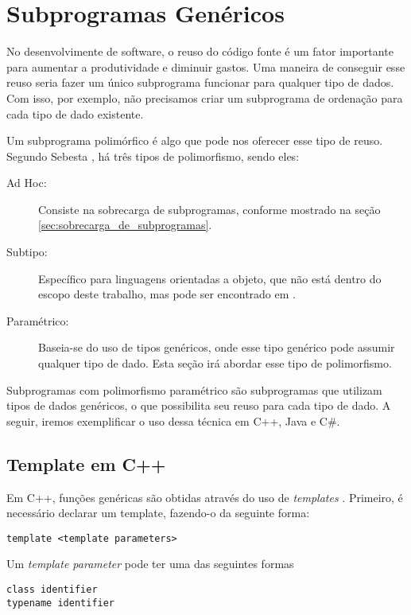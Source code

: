 \section{Subprogramas Genéricos} %
\label{sec:subprogramas_genericos}
No desenvolvimente de software, o reuso do código fonte é um fator importante para aumentar a produtividade e diminuir gastos. Uma maneira de conseguir esse reuso seria fazer um único subprograma funcionar para qualquer tipo de dados. Com isso, por exemplo, não precisamos criar um subprograma de ordenação para cada tipo de dado existente.

Um subprograma polimórfico é algo que pode nos oferecer esse tipo de reuso. Segundo Sebesta \cite{sebesta}, há três tipos de polimorfismo, sendo eles:
\begin{description}
	\item[Ad Hoc:] Consiste na sobrecarga de subprogramas, conforme mostrado na seção \ref{sec:sobrecarga_de_subprogramas}.
	\item[Subtipo:] Específico para linguagens orientadas a objeto, que não está dentro do escopo deste trabalho, mas pode ser encontrado em \cite{poli_java}.
	\item[Paramétrico:] Baseia-se do uso de tipos genéricos, onde esse tipo genérico pode assumir qualquer tipo de dado. Esta seção irá abordar esse tipo de polimorfismo.
\end{description}

Subprogramas com polimorfismo paramétrico são subprogramas que utilizam tipos de dados genéricos, o que possibilita seu reuso para cada tipo de dado. A seguir, iremos exemplificar o uso dessa técnica em C++, Java e C\#.

\subsection{Template em C++} %
\label{sub:template_em_c}
Em C++, funções genéricas são obtidas através do uso de \emph{templates} \cite{template_cpluplus}. Primeiro, é necessário declarar um template, fazendo-o da seguinte forma:
\begin{verbatim}
template <template parameters>
\end{verbatim}

Um \emph{template parameter} pode ter uma das seguintes formas
\begin{verbatim}
class identifier
typename identifier
\end{verbatim}

